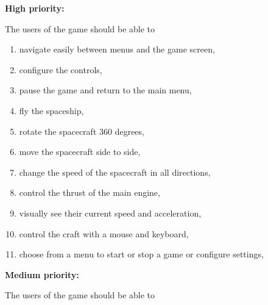 \noindent \textbf{High priority:}

The users of the game should be able to

\begin{multicols}{2}
\begin{enumerate}

  \item navigate easily between menus and the game screen,

  \item configure the controls,

  \item pause the game and return to the main menu,

  \item fly the spaceship,

  \item rotate the spacecraft 360 degrees,

  \item move the spacecraft side to side,

  \item change the speed of the spacecraft in all directions, 

  \item control the thrust of the main engine,

  \item visually see their current speed and acceleration,

  \item control the craft with a mouse and keyboard,

  \item choose from a menu to start or stop a game or configure settings,

\end{enumerate}
\end{multicols}

\noindent \textbf{Medium priority:}

The users of the game should be able to

